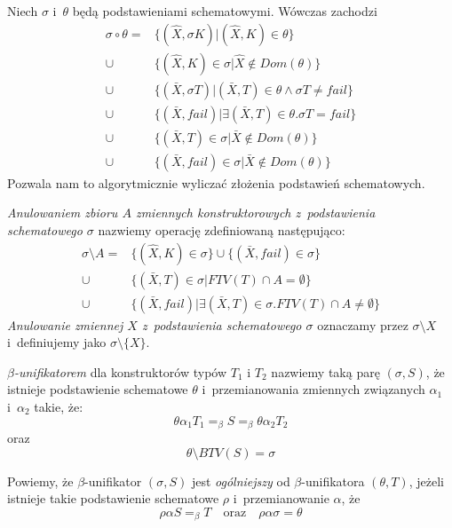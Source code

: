 \documentclass[11pt,leqno]{article}
\begin{document}
\begin{lemat}
Niech $\sigma$ i~$\theta$ będą podstawieniami schematowymi. Wówczas zachodzi
\begin{align*}
\sigma \circ \theta = & \{ (\widehat{X}, \sigma K) | (\widehat{X}, K) \in \theta \} \\
\cup & \{ (\widehat{X}, K) \in \sigma | \widehat{X} \notin Dom(\theta) \} \\
\cup & \{ (\bar{X}, \sigma T) | (\bar{X}, T) \in \theta \land \sigma T \neq fail \} \\
\cup & \{ (\bar{X}, fail) | \exists (\bar{X}, T) \in \theta . \sigma T = fail \} \\
\cup & \{ (\bar{X}, T) \in \sigma | \bar{X} \notin Dom(\theta) \} \\
\cup & \{ (\bar{X}, fail) \in \sigma | \bar{X} \notin Dom(\theta) \}
\end{align*}
Pozwala nam to algorytmicznie wyliczać złożenia podstawień schematowych.
\end{lemat}


\begin{definicja}
\emph{Anulowaniem zbioru $A$ zmiennych konstruktorowych z~podstawienia schematowego $\sigma$} nazwiemy operację
zdefiniowaną następująco:
\begin{align*}
\sigma \setminus A = & \{ (\widehat{X}, K) \in \sigma \} \cup \{ (\bar{X}, fail) \in \sigma \} \\
\cup & \{ (\bar{X}, T) \in \sigma | FTV(T) \cap A = \emptyset \} \\
\cup & \{ (\bar{X}, fail) | \exists (\bar{X}, T) \in \sigma . FTV(T) \cap A \neq \emptyset \}
\end{align*}
\emph{Anulowanie zmiennej $X$ z~podstawienia schematowego $\sigma$} oznaczamy przez $\sigma \setminus X$ i~definiujemy jako $\sigma \setminus \{X\}$.
\end{definicja}

\begin{definicja}
\emph{$\beta$-unifikatorem} dla konstruktorów typów $T_1$ i $T_2$ nazwiemy taką parę $(\sigma, S)$, że istnieje
podstawienie schematowe $\theta$ i~przemianowania zmiennych związanych $\alpha_1$ i~$\alpha_2$ takie, że:
\[
\theta \alpha_1 T_1 =_\beta S =_\beta \theta \alpha_2 T_2
\]
oraz
\[
\theta \setminus BTV(S) = \sigma
\]
\end{definicja}

\begin{definicja}
Powiemy, że $\beta$-unifikator $(\sigma, S)$ jest \emph{ogólniejszy} od $\beta$-unifikatora
$(\theta, T)$, jeżeli istnieje takie podstawienie schematowe $\rho$ i~przemianowanie $\alpha$, że
\[
\rho\alpha S =_\beta T \quad \textrm{oraz} \quad \rho\alpha\sigma = \theta
\]
\end{definicja}
\end{document}
